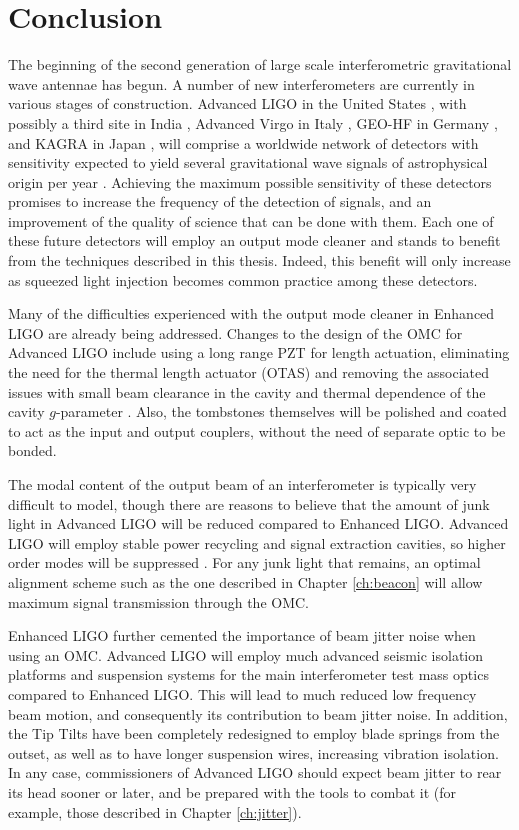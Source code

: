 \chapter{Conclusion}
\label{ch:conclusion}

The beginning of the second generation of large scale interferometric gravitational wave antennae has begun. %
A number of new interferometers are currently in various stages of construction. %
Advanced LIGO in the United States \cite{aLIGO}, with possibly a third site in India \cite{M1100296}, Advanced Virgo in Italy \cite{aVirgo}, GEO-HF in Germany \cite{GEOHF}, and KAGRA in Japan \cite{KAGRA}, will comprise a worldwide network of detectors with sensitivity expected to yield several gravitational wave signals of astrophysical origin per year \cite{CBCrates}. %
Achieving the maximum possible sensitivity of these detectors promises to increase the frequency of the detection of signals, and an improvement of the quality of science that can be done with them. %
Each one of these future detectors will employ an output mode cleaner and stands to benefit from the techniques described in this thesis. %
Indeed, this benefit will only increase as squeezed light injection becomes common practice among these detectors.

Many of the difficulties experienced with the output mode cleaner in Enhanced LIGO are already being addressed. %
Changes to the design of the OMC for Advanced LIGO include using a long range PZT for length actuation, eliminating the need for the thermal length actuator (OTAS) and removing the associated issues with small beam clearance in the cavity and thermal dependence of the cavity $g$-parameter \cite{T1000276,T0900157}. %
Also, the tombstones themselves will be polished and coated to act as the input and output couplers, without the need of separate optic to be bonded. %
 

The modal content of the output beam of an interferometer is typically very difficult to model, though there are reasons to believe that the amount of junk light in Advanced LIGO will be reduced compared to Enhanced LIGO. %
Advanced LIGO will employ stable power recycling and signal extraction cavities, so higher order modes will be suppressed \cite{T080208}. %
For any junk light that remains, an optimal alignment scheme such as the one described in Chapter \ref{ch:beacon} will allow maximum signal transmission through the OMC.

Enhanced LIGO further cemented the importance of beam jitter noise when using an OMC. %
Advanced LIGO will employ much advanced seismic isolation platforms \cite{BSCISI} and suspension systems \cite{quaddesign} for the main interferometer test mass optics compared to Enhanced LIGO. %
This will lead to much reduced low frequency beam motion, and consequently its contribution to beam jitter noise. %
In addition, the Tip Tilts have been completely redesigned to employ blade springs from the outset, as well as to have longer suspension wires, increasing vibration isolation. %
In any case, commissioners of Advanced LIGO should expect beam jitter to rear its head sooner or later, and be prepared with the tools to combat it (for example, those described in Chapter \ref{ch:jitter}).

